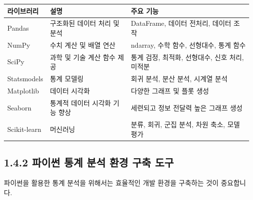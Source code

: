 \documentclass[
  letterpaper,
]{book}
\begin{document}
\begin{itemize}
  \begin{longtable}[]{@{}
    >{\centering\arraybackslash}p{}
    >{\centering\arraybackslash}p{}
    >{\centering\arraybackslash}p{}@{}}
  \toprule\noalign{}
  \begin{minipage}[b]{\linewidth}\centering
  라이브러리
  \end{minipage} & \begin{minipage}[b]{\linewidth}\centering
  설명
  \end{minipage} & \begin{minipage}[b]{\linewidth}\centering
  주요 기능
  \end{minipage} \\
  \midrule\noalign{}
  \endhead
  \bottomrule\noalign{}
  \endlastfoot
  Pandas & 구조화된 데이터 처리 및 분석 & DataFrame, 데이터 전처리,
  데이터 조작 \\
  NumPy & 수치 계산 및 배열 연산 & ndarray, 수학 함수, 선형대수, 통계
  함수 \\
  SciPy & 과학 및 기술 계산 함수 제공 & 통계 검정, 최적화, 선형대수,
  신호 처리, 미적분 \\
  Statsmodels & 통계 모델링 & 회귀 분석, 분산 분석, 시계열 분석 \\
  Matplotlib & 데이터 시각화 & 다양한 그래프 및 플롯 생성 \\
  Seaborn & 통계적 데이터 시각화 기능 향상 & 세련되고 정보 전달력 높은
  그래프 생성 \\
  Scikit-learn & 머신러닝 & 분류, 회귀, 군집 분석, 차원 축소, 모델
  평가 \\
  \end{longtable}
\end{itemize}

\subsection{1.4.2 파이썬 통계 분석 환경 구축
도구}\label{uxd30cuxc774uxc36c-uxd1b5uxacc4-uxbd84uxc11d-uxd658uxacbd-uxad6cuxcd95-uxb3c4uxad6c}

파이썬을 활용한 통계 분석을 위해서는 효율적인 개발 환경을 구축하는 것이
중요합니다.
\end{document}

